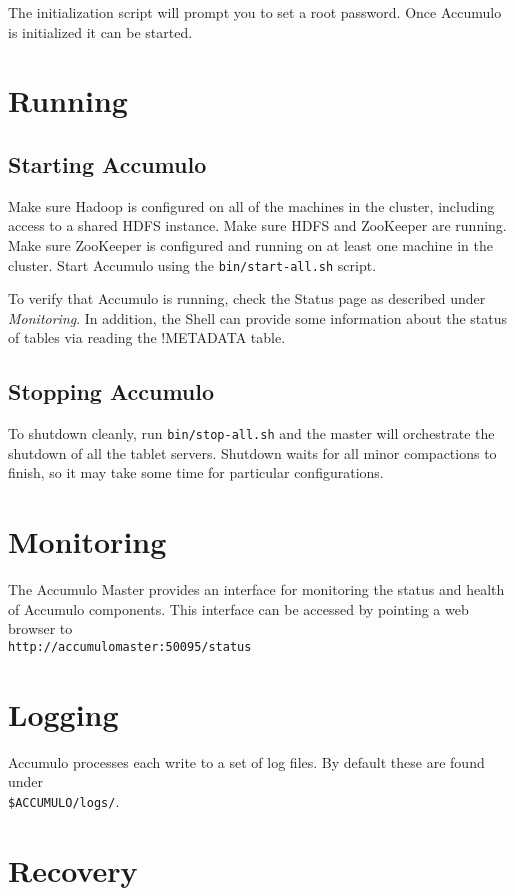 The initialization script will prompt you to set a root password. Once Accumulo is
initialized it can be started.

\section{Running}

\subsection{Starting Accumulo}

Make sure Hadoop is configured on all of the machines in the cluster, including
access to a shared HDFS instance. Make sure HDFS and ZooKeeper are running.
Make sure ZooKeeper is configured and running on at least one machine in the
cluster.
Start Accumulo using the \texttt{bin/start-all.sh} script.

To verify that Accumulo is running, check the Status page as described under
\emph{Monitoring}. In addition, the Shell can provide some information about the status of
tables via reading the !METADATA table.

\subsection{Stopping Accumulo}

To shutdown cleanly, run \texttt{bin/stop-all.sh} and the master will orchestrate the
shutdown of all the tablet servers. Shutdown waits for all minor compactions to finish, so it may
take some time for particular configurations.

\section{Monitoring}

The Accumulo Master provides an interface for monitoring the status and health of
Accumulo components. This interface can be accessed by pointing a web browser to\\
\texttt{http://accumulomaster:50095/status}

\section{Logging}
Accumulo processes each write to a set of log files. By default these are found under\\
\texttt{\$ACCUMULO/logs/}.

\section{Recovery}

